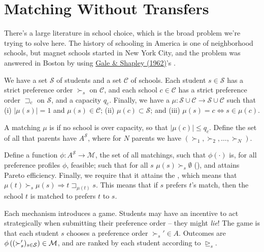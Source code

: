 \documentclass[10pt]{article}
\begin{document}
\section{Matching Without Transfers}

There's a large literature in school choice, which is the broad problem we're trying to solve here. The history of schooling in America is one of neighborhood schools, but magnet schools started in New York City, and the problem was answered in Boston by using \href{https://www.jstor.org/stable/2312726?seq=1}{Gale \& Shapley (1962)}'s .

\begin{model}
	 We have a set $\mathcal{S}$ of students and a set $\mathcal{C}$ of schools. Each student $s \in \mathcal{S}$ has a strict preference order $\succ_s$ on $\mathcal{C}$, and each school $c \in \mathcal{C}$ has a strict preference order $\sqsupset_c$ on $\mathcal{S}$, and a capacity $q_c$. Finally, we have a  $\mu: \mathcal{S} \cup \mathcal{C} \to \mathcal{S} \cup \mathcal{C}$ such that (i) $|\mu(s)| = 1$ and $\mu(s) \in \mathcal{C}$; (ii) $\mu(c) \subset \mathcal{S}$; and (iii) $\mu(s) = c \Longleftrightarrow s \in \mu(c)$.
	
	\begin{definition}
		A matching $\mu$ is  if no school is over capacity, so that $|\mu(c)| \le q_c$. Define the set of all  that parents have $A^\mathcal{S}$, where for $N$ parents we have $(\succ_1,\succ_2,\dots,\succ_N)$. 
		
		Define a function $\phi: A^\mathcal{S} \to \mathcal{M}$, the set of all matchings, such that $\phi(\cdot)$ is, for all preference profiles $\phi$, feasible; such that for all $s$ $\mu(s) \succ_s \emptyset$ (), and attains Pareto efficiency. Finally, we require that it attains the , which means that $\mu(t) \succ_s \mu(s) \Longrightarrow t \sqsupset_{\mu(t)} s$. This means that if $s$ prefers $t$'s match, then the school $t$ is matched to prefers $t$ to $s$. 
	\end{definition}
\end{model}

\begin{remark}
	Each mechanism introduces a game. Students may have an incentive to act strategically when submitting their preference order -- they might \emph{lie}! The game is that each student $s$ chooses a preference order $\succ_s' \in A$. Outcomes are $\phi\left( (\succ'_s)_{s \in \mathcal{S}}\right) \in \mathcal{M}$, and are ranked by each student according to $\unrhd_s$. 
\end{remark}
\end{document}
